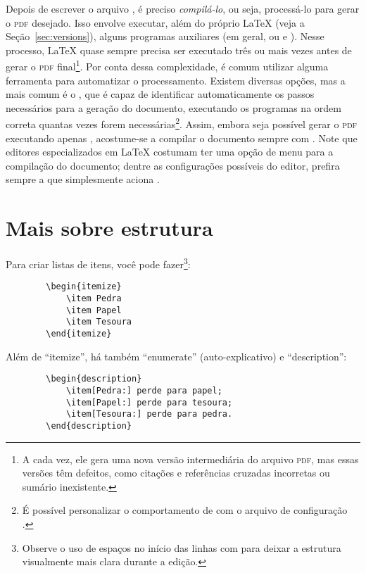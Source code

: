 Depois de escrever o arquivo , é preciso \emph{compilá-lo}, ou
seja, processá-lo para gerar o \textsc{pdf} desejado. Isso envolve executar,
além do próprio \LaTeX{} (veja a Seção~\ref{sec:versions}), alguns
programas auxiliares (em geral,  ou  e
). Nesse processo, \LaTeX{} quase sempre precisa ser
executado três ou mais vezes antes de gerar o \textsc{pdf} final\footnote{A
cada vez, ele gera uma nova versão intermediária do arquivo \textsc{pdf},
mas essas versões têm defeitos, como citações e referências cruzadas
incorretas ou sumário inexistente.}. Por conta dessa complexidade, é comum
utilizar alguma ferramenta para automatizar o processamento. Existem diversas
opções, mas a mais comum é o , que é capaz de identificar
automaticamente os passos necessários para a geração do documento,
executando os programas na ordem correta quantas vezes forem
necessárias\footnote{É possível personalizar o comportamento de 
com o arquivo de configuração .}. Assim, embora seja possível
gerar o \textsc{pdf} executando apenas ,
acostume-se a compilar o documento sempre com .
Note que editores especializados em \LaTeX{} costumam ter uma opção de menu
para a compilação do documento; dentre as configurações possíveis do editor,
prefira sempre a que simplesmente aciona .

\section{Mais sobre estrutura}
\label{sec:estrutura}

Para criar listas de itens, você pode fazer\footnote{Observe o uso de
espaços no início das linhas com  para deixar a
estrutura visualmente mais clara durante a edição.}:

\begin{verbatim}
        \begin{itemize}
            \item Pedra
            \item Papel
            \item Tesoura
        \end{itemize}
\end{verbatim}

Além de ``itemize'', há também ``enumerate'' (auto-explicativo) e ``description'':

\begin{verbatim}
        \begin{description}
            \item[Pedra:] perde para papel;
            \item[Papel:] perde para tesoura;
            \item[Tesoura:] perde para pedra.
        \end{description}
\end{verbatim}

